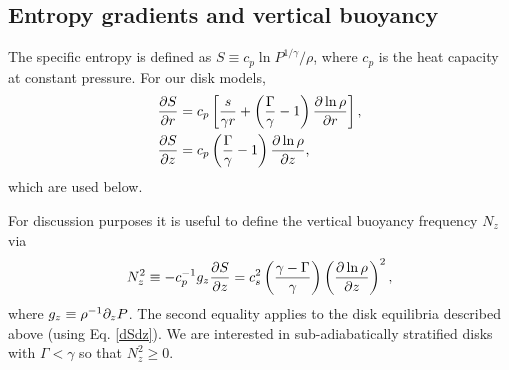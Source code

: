 \subsection{Entropy gradients and vertical buoyancy}
The specific entropy is defined as $S\equiv
c_p\ln{P^{1/\gamma}/\rho}$, where $c_p$ is the heat capacity at
constant pressure. For our disk models,
\begin{align}
  &\frac{\partial S}{\partial r} = c_p\left[\frac{s}{\gamma r} +
    \left(\frac{\Gamma}{\gamma}-1\right)\frac{\partial \ln{\rho}}{\partial
       r}\right],\\
  &\frac{\partial S}{\partial z} = c_p
  \left(\frac{\Gamma}{\gamma}-1\right)\frac{\partial \ln{\rho}}{\partial z},\label{dSdz}
\end{align} 
which are used below. 

For discussion purposes it is useful to define the vertical buoyancy
frequency $N_z$ via 
\begin{align}
  N_z^2 \equiv - c_p^{-1}g_z \frac{\partial S}{\partial z} = c_s^2 \left(\frac{\gamma -
      \Gamma}{\gamma}\right)\left(\frac{\partial\ln\rho}{\partial z}\right)^2,   \label{nzsq_def}
\end{align}
where $g_z\equiv \rho^{-1}\partial_zP $. The second equality applies to the
disk equilibria described above (using Eq. \ref{dSdz}). We are
interested in sub-adiabatically stratified disks with $\Gamma <
\gamma$ so that $N_z^2\geq0$. %

